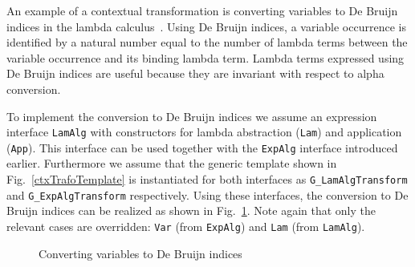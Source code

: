 An example of a contextual transformation is converting variables to De Bruijn indices in the lambda calculus~\cite{deBruijn1972381}.
Using De Bruijn indices, a variable occurrence is identified by a natural number equal to the number of lambda terms between the variable occurrence and its binding lambda term.
Lambda terms expressed using De Bruijn indices are useful because they are invariant with respect to alpha conversion.

To implement the conversion to De Bruijn indices we assume an expression interface \lstinline{LamAlg} with constructors for lambda abstraction (\lstinline{Lam}) and application (\lstinline{App}).
This interface can be used together with the \lstinline{ExpAlg} interface introduced earlier.
Furthermore we assume that the generic template shown in Fig.~\ref{ctxTrafoTemplate} is instantiated for both interfaces as \lstinline{G_LamAlgTransform} and \lstinline{G_ExpAlgTransform} respectively.
Using these interfaces, the conversion to De Bruijn indices can be realized as shown in Fig.~\ref{DeBruijn}.
Note again that only the relevant cases are overridden: \lstinline{Var} (from \lstinline{ExpAlg}) and \lstinline{Lam} (from \lstinline{LamAlg}).


\begin{figure}[t]
\vspace{-.1in}
\caption{Converting variables to De Bruijn indices}
\label{DeBruijn}
\end{figure}




